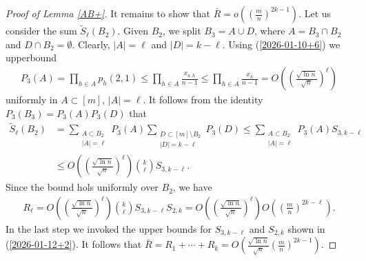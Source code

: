 \documentclass[10pt,a4paper]{amsart}
\begin{document}
\begin{proof}[ Proof of Lemma \ref{AB+}]
It remains to show that ${\bar R}=o
\left(
\left(\frac{m}{n}\right)^{2k-1}
\right)$. Let us consider the sum
${\tilde S}_\ell(B_2)$.
Given $B_2$, we split $B_3=A\cup D$, 
where $A=B_3\cap B_2$  and $D\cap B_2=\emptyset$.
Clearly, $|A|=\ell$ 
and  $|D|=k-\ell$. 
Using (\ref{2026-01-10+6}) we upperbound
\begin{align*}
P_3(A)
=
\prod_{h\in A}p_h(2,1)
\le 
\prod_{h\in A}\frac{x_{a,h}}{n-1}
\le 
\prod_{h\in A}\frac{x_{h}}{n-1}
=
O
\left(
\left(
\frac{\sqrt{\ln n}}{\sqrt{n}}
\right)^\ell
\right)
\end{align*}
 uniformly in $A\subset [m]$, $|A|=\ell$. 
 It follows from the identity $P_3(B_3)=P_3(A)P_3(D)$
 that
\begin{align*}
{\tilde S}_\ell(B_2)
&
=
\sum_{\substack{A\subset B_2\\
|A|=\ell}}
P_3(A)
\sum_{\substack{D\subset [m]\setminus B_2\\
|D|=k-\ell}}
P_3(D)
\le
\sum_{\substack{A\subset B_2\\
|A|=\ell}}
P_3(A)
S_{3,k-\ell}
\\
&
\le 
O
\left(
\left(
\frac{\sqrt{\ln n}}{\sqrt{n}}
\right)^\ell
\right)
\binom{k}{\ell}
S_{3,k-\ell}.
\end{align*}
Since the bound hols uniformly over $B_2$, we have
\begin{align*}
R_\ell
=
O
\left(
\left(
\frac{\sqrt{\ln n}}{\sqrt{n}}
\right)^\ell
\right)
\binom{k}{\ell}
S_{3,k-\ell}
S_{2,k}
=
O
\left(
\left(
\frac{\sqrt{\ln n}}{\sqrt{n}}
\right)^\ell
\right)
O\left(\left(\frac{m}{n}\right)^{2k-\ell}
\right).
\end{align*}
In the last step we invoked the upper bounds for $S_{3,k-\ell}$ 
and
$S_{2,k}$ 
shown in (\ref{2026-01-12+2}).
It follows that ${\bar R}=R_1+\cdots+R_k=O
\left(
\frac{\sqrt{\ln n}}{\sqrt{n}}
\left(\frac{m}{n}\right)^{2k-1}
\right)$.
\end{proof}
\end{document}
